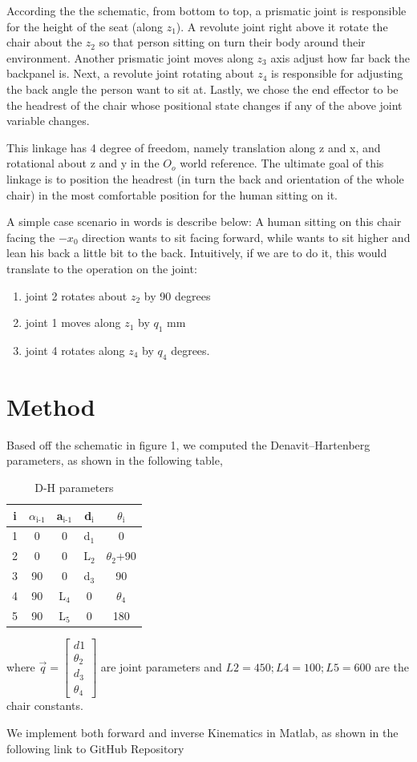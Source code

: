 \documentclass[12pt, letterpaper]{amsart} %
\numberwithin{equation}{section}
\begin{document}
According the the schematic, from bottom to top, a prismatic joint is responsible for the height of the seat (along $z_1$). A revolute joint right above it rotate the chair about the $z_2$  so that person sitting on turn their body around their environment. Another prismatic joint moves along $z_3$ axis adjust how far back the backpanel is. Next, a revolute joint rotating about $z_4$ is responsible for adjusting the back angle the person want to sit at. Lastly, we chose the end effector to be the headrest of the chair whose positional state changes if any of the above joint variable changes.
\par
This linkage has 4 degree of freedom, namely translation along z and x, and rotational about z and y in the $O_o$ world reference. The ultimate goal of this linkage is to position the headrest (in turn the back and orientation of the whole chair) in the most comfortable position for the human sitting on it.
\par
A simple case scenario in words is describe below: A human sitting on this chair facing the $-x_0$ direction wants to sit facing forward, while wants to sit higher and lean his back a little bit to the back. Intuitively, if we are to do it, this would translate to the operation on the joint:
\begin{enumerate}
\item joint 2 rotates about $z_2$ by 90 degrees
\item joint 1 moves along $z_1$ by $q_1$ mm
\item joint 4 rotates along $z_4$ by $q_4$ degrees.  
\end{enumerate}

\section{Method}
Based off the schematic in figure 1, we computed the Denavit–Hartenberg parameters, as shown in the following table,
\begin{table}[H]
  \centering
  \begin{tabular}{c|cccc}
i & $\alpha$$_{\text{i-1}}$ & a$_{\text{i-1}}$ & d$_{\text{i}}$ & $\theta$$_{\text{i}}$\\
\hline
1 & 0 & 0 & d$_{\text{1}}$ & 0\\
2 & 0 & 0 & L$_{\text{2}}$ & $\theta_2$+90\\
3 & 90 & 0 & d$_{\text{3}}$ & 90\\
4 & 90 & L$_{\text{4}}$ & 0 & $\theta$$_{\text{4}}$\\
5 & 90 & L$_{\text{5}}$ & 0 & 180\\
\end{tabular}
  \caption{D-H parameters}
\end{table}
where $\vec{q} =
\begin{bmatrix}
  d1 \\ \theta_2 \\ d_3 \\ \theta_4
\end{bmatrix}
$ are joint parameters and $L2 = 450; L4 = 100; L5 = 600$ are the chair constants.
\par
We implement both forward and inverse Kinematics in Matlab, as shown in the following link to GitHub Repository \link{}
\end{document}
